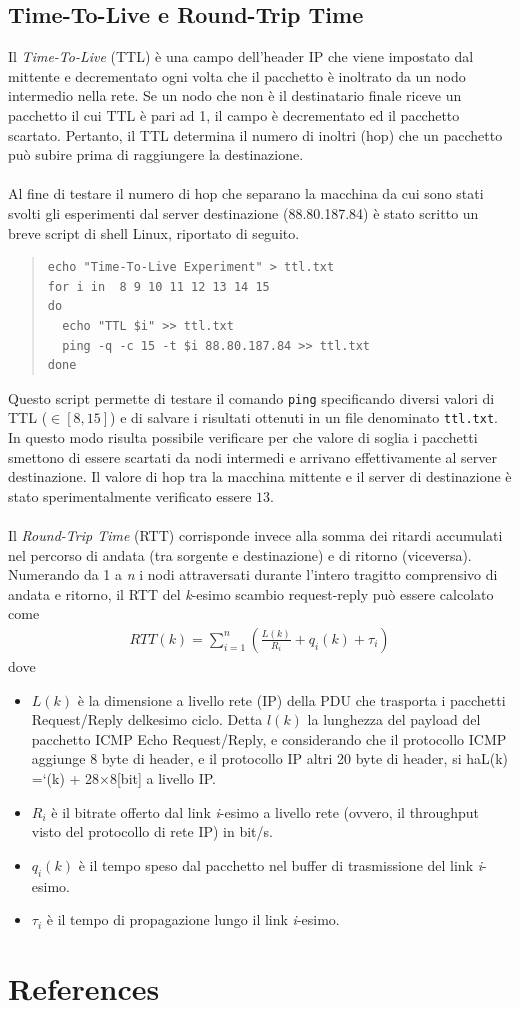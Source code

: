 \documentclass[a4paper,10pt]{article}
\begin{document}
\newpage
\subsection{Time-To-Live e Round-Trip Time}
Il \textit{Time-To-Live} (TTL) è una campo dell'header IP che viene impostato dal mittente e decrementato ogni volta che il pacchetto è inoltrato da un nodo intermedio nella rete. Se un nodo che non è il destinatario finale riceve un pacchetto il cui TTL è pari ad 1, il campo è decrementato ed il pacchetto scartato. Pertanto, il TTL determina il numero di inoltri (hop) che un pacchetto può subire prima di raggiungere la destinazione.\\\\
Al fine di testare il numero di hop che separano la macchina da cui sono stati svolti gli esperimenti dal server destinazione (88.80.187.84) è stato scritto un breve script di shell Linux, riportato di seguito.
\begin{quote}
\begin{verbatim}
echo "Time-To-Live Experiment" > ttl.txt
for i in  8 9 10 11 12 13 14 15 
do
  echo "TTL $i" >> ttl.txt
  ping -q -c 15 -t $i 88.80.187.84 >> ttl.txt
done
\end{verbatim}
\end{quote}
Questo script permette di testare il comando \texttt{ping} specificando diversi valori di TTL ($\in[8, 15]$) e di salvare i risultati ottenuti in un file denominato \texttt{ttl.txt}. In questo modo risulta possibile verificare per che valore di soglia i pacchetti smettono di essere scartati da nodi intermedi e arrivano effettivamente al server destinazione. Il valore di hop tra la macchina mittente e il server di destinazione è stato sperimentalmente verificato essere \textbf{$13$}.\\\\
Il \textit{Round-Trip Time} (RTT) corrisponde invece alla somma dei ritardi accumulati nel percorso di andata (tra sorgente e destinazione) e di ritorno (viceversa). Numerando da 1 a \textit{n} i nodi attraversati durante l'intero tragitto comprensivo di andata e ritorno, il RTT del \textit{k}-esimo scambio request-reply può essere calcolato come
\begin{align*}
RTT(k) = \sum_{i=1}^{n} \left( \frac{L(k)}{R_i} + q_i(k) + \tau_i \right)
\end{align*}
dove
\begin{itemize}
\item $L(k)$ è la dimensione a livello rete (IP) della PDU che trasporta i pacchetti Request/Reply delkesimo ciclo.  Detta $l(k)$ la lunghezza del payload del pacchetto ICMP Echo Request/Reply, e considerando che il protocollo ICMP aggiunge 8 byte di header, e il protocollo IP altri 20 byte di header, si haL(k) =`(k) + 28×8[bit] a livello IP.
\item $R_i$ è il bitrate offerto dal link \textit{i}-esimo a livello rete (ovvero, il throughput visto del protocollo di rete IP) in bit/s.
\item $q_i(k)$ è il tempo speso dal pacchetto nel buffer di trasmissione del link \textit{i}-esimo.
\item $\tau_i$ è il tempo di propagazione lungo il link \textit{i}-esimo.
\end{itemize}

\newpage

\section{References}
\printbibliography[heading=none]
\end{document}
